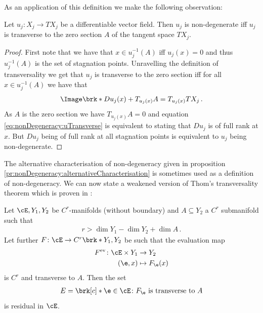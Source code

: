 As an application of this definition we make the following observation:
\begin{proposition}\label{pr:nonDegeneracy:alternativeCharacterisation}
  Let $u_j\colon X_j\to TX_j$ be a differentiable vector field.
  Then $u_j$ is non-degenerate iff $u_j$ is transverse to the zero section $A$ of the tangent space $TX_j$.
\end{proposition}
\begin{proof}
  First note that we have that $x\in u_j^{-1}(A)$ iff $u_j(x)=0$ and thus $u_j^{-1}(A)$ is the set of stagnation points.
  Unravelling the definition of transversality we get that $u_j$ is transverse to the zero section iff for all $x\in u_j^{-1}(A)$
  we have that
  \begin{align}
    \Image\brk*{Du_j(x)}+T_{u_j(x)}A = T_{u_j(x)}TX_j\,. \label{eq:nonDegeneracy:uTransverse}
  \end{align}
  As $A$ is the zero section we have $T_{u_j(x)}A=0$ and equation \eqref{eq:nonDegeneracy:uTransverse}
  is equivalent to stating that $Du_j$ is of full rank at $x$. But $Du_j$ being of full rank at all stagnation points
  is equivalent to $u_j$ being non-degenerate.
\end{proof}
The alternative characterisation of non-degeneracy given in proposition \ref{pr:nonDegeneracy:alternativeCharacterisation}
is sometimes used as a definition of non-degeneracy.
We can now state a weakened version of Thom's transversality theorem which is proven in \cite[§3 Theorem 2.7]{Hirsch1994}:
\begin{theorem}
  Let $\cE,Y_1,Y_2$ be $C^r$-manifolds (without boundary) and $A\subseteq Y_2$ a $C^r$ submanifold such that
  \begin{align*}
    r>\dim Y_1-\dim Y_2+\dim A\,.
  \end{align*}
  Let further $F\colon \cE\to C^r\brk*{Y_1,Y_2}$ be such that the evaluation map
  \begin{align*}
    F^\text{ev}\colon \cE\times Y_1&\to Y_2 \\
    (\e,x)&\mapsto F_\e(x)
  \end{align*}
  is $C^r$ and transverse to $A$.
  Then the set
  \begin{align*}
    E=\brk[c]*{\e\in \cE\colon F_\e\text{ is transverse to } A}
  \end{align*}
  is residual in $\cE$.
\end{theorem}
